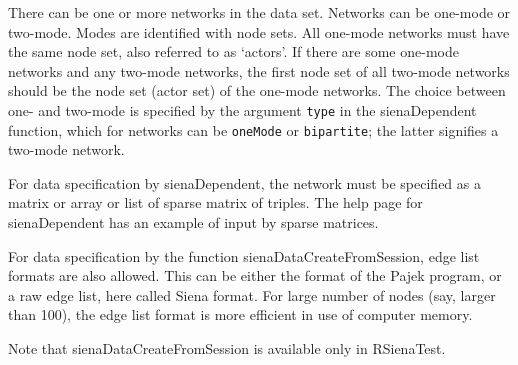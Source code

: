 \documentclass[a4paper,fleqn,11pt]{article}
\newcommand{\+}{\, + \,}
\begin{document}
There can be one or more networks in the data set.
Networks can be one-mode or two-mode.
Modes are identified with node sets.
All one-mode networks must have the same node set,
also referred to as `actors'.
If there are some one-mode networks and any two-mode networks,
the first node set of all two-mode networks should be the node set
(actor set) of the one-mode networks.
The choice between one- and two-mode is specified by the argument
\texttt{type} in  the \textsf{sienaDependent} function, which for
networks can be \texttt{oneMode} or \texttt{bipartite};
the latter signifies a two-mode network.

For data specification by  \textsf{sienaDependent}, the network
must be specified as a matrix or array or list of sparse matrix of triples.
The help page for \textsf{sienaDependent} has an example of input
by sparse matrices.

For data specification by
the function \textsf{sienaDataCreateFromSession},
edge list formats are also allowed. This can be either the
format of the Pajek program, or a raw edge list, here called Siena format.
For large number of nodes (say, larger than 100), the edge list
format is more efficient in use of computer memory.

Note that  \textsf{sienaDataCreateFromSession} is available only
in  \textsf{RSienaTest}.
\end{document}
